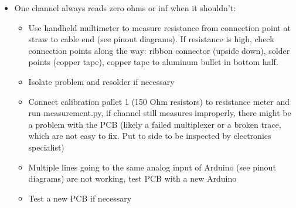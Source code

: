 \documentclass[letterpaper,12pt]{article}
\begin{document}
\begin{enumerate}
\begin{itemize}
		\item One channel always reads zero ohms or inf when it shouldn’t:
		\begin{itemize}
		\item Use handheld multimeter to measure resistance from connection point at straw to cable end (see pinout diagrams). If resistance is high, check connection points along the way: ribbon connector (upside down), solder points (copper tape), copper tape to aluminum bullet in bottom half.
		\item Isolate problem and resolder if necessary
		\item Connect calibration pallet 1 (150 Ohm resistors) to resistance meter and run measurement.py, if channel still measures improperly, there might be a problem with the PCB (likely a failed multiplexer or a broken trace, which are not easy to fix. Put to side to be inspected by electronics specialist)
		\item Multiple lines going to the same analog input of Arduino (see pinout diagrams) are not working, test PCB with a new Arduino
		\item Test a new PCB if necessary
		\end{itemize}
	\end{itemize}
\end{enumerate}

\end{document}
